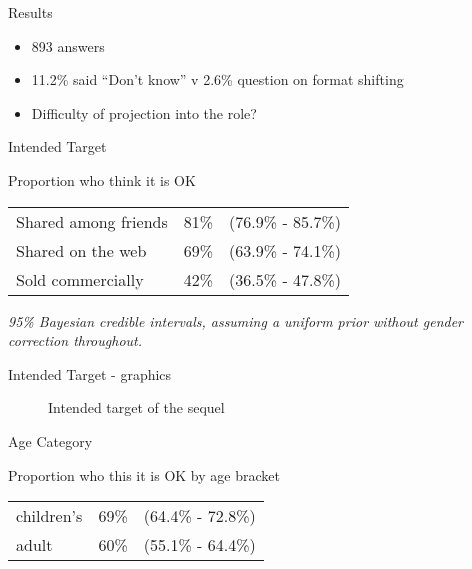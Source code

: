 \documentclass{beamer}
\begin{document}
\begin{frame}{Results}
  \begin{itemize}
  \item 893 answers
  \item 11.2\% said ``Don't know'' v 2.6\% question on format shifting
  \item Difficulty of projection into the role?
  \end{itemize}

\end{frame}
\begin{frame}{Intended Target}
\begin{table}
{Proportion who think it is OK\vspace{1.0em}}

\begin{tabular}{lrl}
Shared among friends & 81\% & (76.9\% - 85.7\%)\\
Shared on the web & 69\% & (63.9\% - 74.1\%) \\
Sold commercially & 42\% & (36.5\% - 47.8\%)\\
\end{tabular}

\end{table}

{\it 95\% Bayesian credible intervals, assuming a uniform prior without gender correction throughout.}
\end{frame}

\begin{frame}{Intended Target - graphics}
   
\begin{figure}[H]
{Intended target of the sequel\vspace{1.0em}}

\scalebox{0.5}{}
\end{figure}

\end{frame}

\begin{frame}{Age Category}
  \begin{table}
{Proportion who this it is OK by age bracket\vspace{1.0em}}
      
      \begin{tabular}{lrl}
        children's & 69\% & (64.4\% - 72.8\%) \\
        adult & 60\% & (55.1\% - 64.4\%) \\
      \end{tabular}
  \end{table}
  
  
\end{frame}
\end{document}
